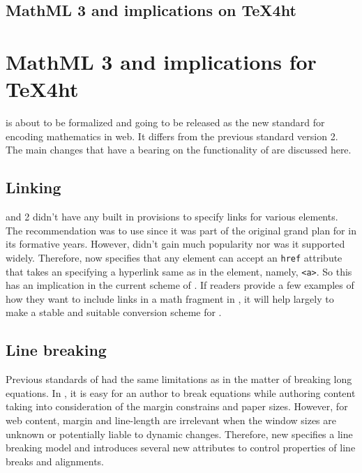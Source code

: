\documentclass[a4paper]{article}
\begin{document}
\section{MathML 3 and implications on TeX4ht}
\else
\chapter{MathML 3 and implications for \TeX4ht}
\fi

\leavevmode
{} is about to be formalized and going to be released as the new standard for encoding mathematics in web. It differs from the previous standard version 2. The main changes that have a bearing on the functionality of  are discussed here.

\section{Linking}

 and 2 didn't have any built in provisions to specify links for various elements. The recommendation was to use  since it was part of the original grand plan for  in its formative years. However, \xlink didn't gain much popularity nor was it supported widely. Therefore,  now specifies that any \mathml element can accept an \verb+href+ attribute that takes an \uri specifying a hyperlink same as in the  element, namely, \verb+<a>+. So this has an implication in the current scheme of \texht. If readers provide a few examples of how they want to include links in a math fragment in \latex, it will help largely to make a stable and suitable conversion scheme for \texht.

\section{Line breaking}

Previous standards of \mathml had the same limitations as \tex in the matter of breaking long equations. In \tex, it is easy for an author to break equations while authoring content taking into consideration of the margin constrains and paper sizes. However, for web content, margin and line-length are irrelevant when the window sizes are unknown or potentially liable to dynamic changes. Therefore, new  specifies a line breaking model and introduces several new attributes to control properties of line breaks and alignments. 
\end{document}
